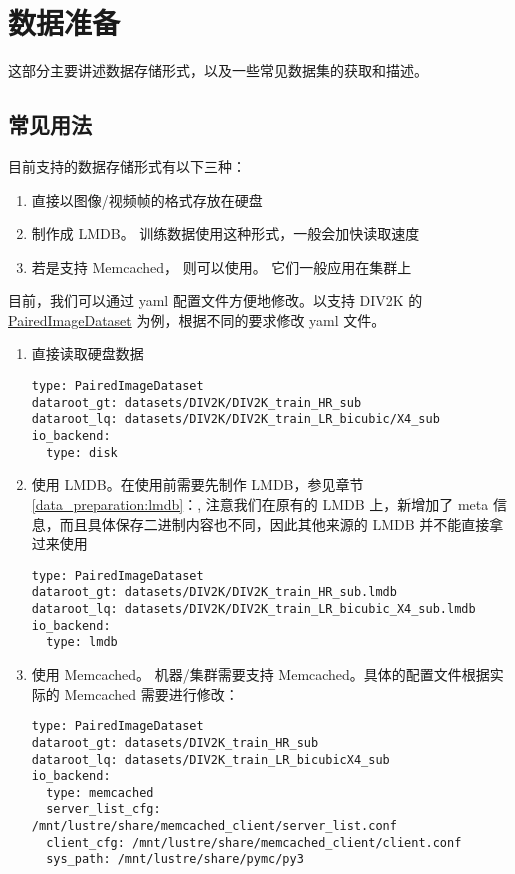 \documentclass[../main.tex]{subfiles}
\begin{document}
\chapter{数据准备}\label{chapter:data_preparation}
\vspace{-2cm}
这部分主要讲述数据存储形式，以及一些常见数据集的获取和描述。

\section{常见用法}\label{data_preparation:common_use}

目前支持的数据存储形式有以下三种：

\begin{enumerate}
    \item 直接以图像/视频帧的格式存放在硬盘
    \item 制作成 LMDB。 训练数据使用这种形式，一般会加快读取速度
    \item 若是支持 Memcached， 则可以使用。 它们一般应用在集群上
\end{enumerate}

目前，我们可以通过 yaml 配置文件方便地修改。以支持 DIV2K 的 \href{https://github.com/XPixelGroup/BasicSR/blob/master/basicsr/data/paired_image_dataset.py}{PairedImageDataset} 为例，根据不同的要求修改 yaml 文件。

\begin{enumerate}
    \item 直接读取硬盘数据
          \begin{verbatim}
type: PairedImageDataset
dataroot_gt: datasets/DIV2K/DIV2K_train_HR_sub
dataroot_lq: datasets/DIV2K/DIV2K_train_LR_bicubic/X4_sub
io_backend:
  type: disk
\end{verbatim}

    \item 使用 LMDB。在使用前需要先制作 LMDB，参见章节 \ref{data_preparation:lmdb}：, 注意我们在原有的 LMDB 上，新增加了 meta 信息，而且具体保存二进制内容也不同，因此其他来源的 LMDB 并不能直接拿过来使用
          \begin{verbatim}
type: PairedImageDataset
dataroot_gt: datasets/DIV2K/DIV2K_train_HR_sub.lmdb
dataroot_lq: datasets/DIV2K/DIV2K_train_LR_bicubic_X4_sub.lmdb
io_backend:
  type: lmdb
\end{verbatim}

    \item 使用 Memcached。 机器/集群需要支持 Memcached。具体的配置文件根据实际的 Memcached 需要进行修改：
          \begin{verbatim}
type: PairedImageDataset
dataroot_gt: datasets/DIV2K_train_HR_sub
dataroot_lq: datasets/DIV2K_train_LR_bicubicX4_sub
io_backend:
  type: memcached
  server_list_cfg: /mnt/lustre/share/memcached_client/server_list.conf
  client_cfg: /mnt/lustre/share/memcached_client/client.conf
  sys_path: /mnt/lustre/share/pymc/py3
\end{verbatim}
\end{enumerate}
\end{document}
